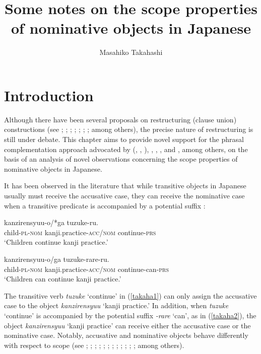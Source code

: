 \documentclass[output=paper]{langscibook}
\author{Masahiko Takahashi\affiliation{Yamagata University}\orcid{}}
\title{Some notes on the scope properties of nominative objects in Japanese}
\begin{document}
\maketitle

\section{Introduction}
Although there have been several proposals on restructuring (clause union) constructions (see \citealt{Miyagawa1987}; \citealt{SaitoHoshi1998}; \citealt{Cinque2006}; \citealt{wurmbrand2001, Wurmbrand2015a,Wurmbrand2015b}; \citealt{bobaljikwurmbrand2005, bobaljikwurmbrand2007}; \citealt{nomura2005}; \citealt{takahashi2011}; \citealt{shimamurawurmbrand2014} among others), the precise nature of restructuring is still under debate. This chapter aims to provide novel support for the phrasal complementation approach advocated by \citeauthor{wurmbrand2001} (\citeyear{wurmbrand2001},
\citeyear{Wurmbrand2015a}, \citeyear{Wurmbrand2015b}), \citet{bobaljikwurmbrand2005, bobaljikwurmbrand2007}, \citet{nomura2005}, \citet{takahashi2011}, and \citet{shimamurawurmbrand2014}, among others, on the basis of an analysis of novel observations concerning the scope properties of nominative objects in Japanese.

It has been observed in the literature that while transitive objects in Japanese usually must receive the accusative case, they can receive the nominative case when a transitive predicate is accompanied by a potential suffix \citep{kuno1973}:

\ea \label{takaha1}
 {kanzirensyuu-o/*ga} {tuzuke-ru.}\\
	child-\textsc{pl}-\textsc{nom}       kanji.practice-\textsc{acc/nom} continue-\textsc{prs}\\
\glt `Children continue kanji practice.’
\z

\ea \label{takaha2}
 {kanzirensyuu-o/ga} {tuzuke-rare-ru.}\\
	child-\textsc{pl}-\textsc{nom}       kanji.practice-\textsc{acc/nom} continue-can-\textsc{prs}\\
\glt `Children can continue kanji practice.’
\z

The transitive verb \emph{tuzuke} ‘continue’ in (\ref{takaha1}) can only assign the accusative case to the object \emph{kanzirensyuu} ‘kanji practice.’ In addition, when \emph{tuzuke} ‘continue’ is accompanied by the potential suffix \emph{-rare} ‘can’, as in (\ref{takaha2}), the object \emph{kanzirensyuu} ‘kanji practice’ can receive either the accusative case or the nominative case. Notably, accusative and nominative objects behave differently with respect to scope (see \citealt{Sano1985}; \citealt{Tada1992}; \citealt{Koizumi1998,Koizumi2008}; \citealt{Ura1999}; \citealt{Yatsushiro1999}; \citealt{Takano2003}; \citealt{nomura2005}; \citealt{bobaljikwurmbrand2007}; \citealt{takahashi2011}; \citealt{shimamurawurmbrand2014}; \citealt{FunakoshiTakahashi2014}; \citealt{ochisaruwatari2014a}; \citealt{kasai2018} among others). 
\end{document}
